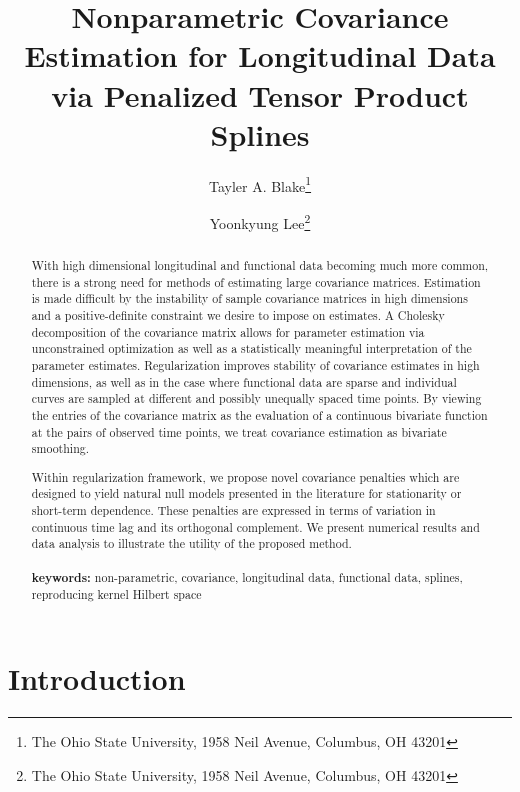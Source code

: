 \documentclass[12pt]{article}
\theoremstyle{definition}
\begin{document}
\title{ Nonparametric Covariance Estimation for Longitudinal Data via Penalized Tensor Product Splines}

\author{Tayler A. Blake\thanks{The Ohio State University, 1958 Neil Avenue, Columbus, OH 43201} \and  Yoonkyung Lee\thanks{The Ohio State University, 1958 Neil Avenue, Columbus, OH 43201}}

\maketitle

\begin{abstract}
With high dimensional longitudinal and functional data becoming much more common, there is a strong need for methods of estimating large covariance matrices. Estimation is made difficult  by the instability of sample covariance matrices in high dimensions and a positive-definite constraint we desire to impose on estimates. A Cholesky decomposition of the covariance matrix allows for parameter estimation via unconstrained optimization as well as a statistically meaningful interpretation of the parameter estimates. Regularization improves stability of covariance estimates in high dimensions, as well as in the case where functional data are sparse and individual curves are sampled at different and possibly unequally spaced time points. By viewing the entries of the covariance matrix as the evaluation of a continuous bivariate function at the pairs of observed time points, we treat covariance estimation as bivariate smoothing. 

Within regularization framework, we propose novel covariance penalties which are designed to yield natural null models presented in the literature for stationarity or short-term dependence. These penalties are expressed in terms of variation in continuous time lag and its orthogonal complement. We present numerical results and data analysis to illustrate the utility of the proposed method. \\
\\
{\bf keywords:} non-parametric, covariance, longitudinal data, functional data, splines, reproducing kernel Hilbert space
\end{abstract}

\section{Introduction}
\end{document}
